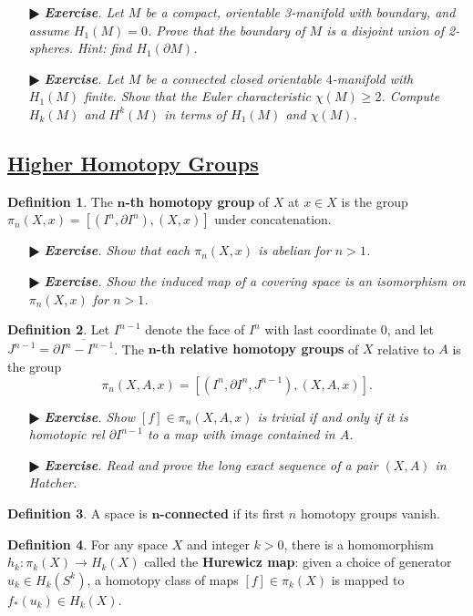 \documentclass[11pt]{amsart}
\theoremstyle{definition}
\newtheorem*{definition*}{Definition}
\renewcommand\geq{\geqslant}
\renewcommand\:{\colon}
\renewcommand\bar[1]{\overline{#1}}
\newcommand{\1}{\mathds{1}}
\newcommand{\exc}[1]{\vspace{-2.5pt}\begin{itemize}[leftmargin=15pt]\item[$\RHD$] \textit{\textbf{Exercise}. #1}\end{itemize}}
\begin{document}
\exc{Let $M$ be a compact, orientable 3-manifold with boundary, and assume $H_1(M) = 0$. Prove that the boundary of $M$ is a disjoint union of 2-spheres. Hint: find $H_1(\partial M)$.}
\exc{Let $M$ be a connected closed orientable $4$-manifold with $H_1(M)$ finite. Show that the Euler characteristic $\chi(M) \geq 2$. Compute $H_k(M)$ and $H^k(M)$ in terms of $H_1(M)$ and $\chi(M)$.}

\vskip20pt



\subsection*{\underline{Higher Homotopy Groups}}

\begin{definition*}
	The \textbf{$\boldsymbol{n}$-th homotopy group} of $X$ at $x \in X$ is the group $\pi_n(X, x) = [(I^n, \partial I^n), (X, x)]$ under concatenation.
\end{definition*}

\exc{Show that each $\pi_n(X, x)$ is abelian for $n > 1$.}
\exc{Show the induced map of a covering space is an isomorphism on $\pi_n(X,x)$ for $n > 1$.}

\begin{definition*}
	Let $I^{n-1}$ denote the face of $I^n$ with last coordinate $0$, and let $J^{n-1} = \bar{\partial I^n - I^{n-1}}$. The \textbf{$\boldsymbol{n}$-th relative homotopy groups} of $X$ relative to $A$ is the group \[ \pi_n(X, A, x) = [(I^n, \partial I^n, J^{n-1}), (X, A, x)]. \] 
\end{definition*}

\exc{Show $[f] \in \pi_n(X, A, x)$ is trivial if and only if it is homotopic \textnormal{rel} $\partial I^{n-1}$ to a map with image contained in $A$.}
\exc{Read and prove the long exact sequence of a pair $(X, A)$ in Hatcher.}

\begin{definition*}
	A space is \textbf{$\boldsymbol{n}$-connected} if its first $n$ homotopy groups vanish.
\end{definition*}

\begin{definition*}
	For any space $X$ and integer $k > 0$, there is a homomorphism $h_k\: \pi_k(X) \to H_k(X)$ called the \textbf{Hurewicz map}: given a choice of generator $u_k \in H_k(S^k)$, a homotopy class of maps $[f] \in \pi_k(X)$ is mapped to $f_*(u_k) \in H_k(X)$.
\end{definition*}
\end{document}
